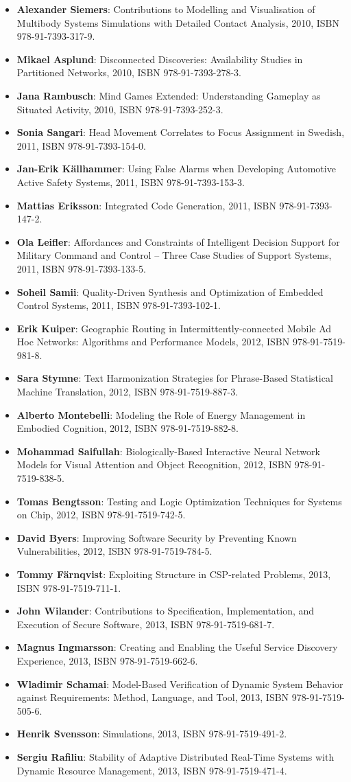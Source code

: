 \documentclass[a4paper,showtrims,twocolumn]{memoir}
\newenvironment{theses}
  {
    \begin{itemize}
      \setlength{\itemsep}{0.2em}
      \setlength{\parskip}{0em}
      \setlength{\parsep}{0em}
  }
  {
    \end{itemize}
  }
\newcommand{\thesis}[5]{\item[No. #1] \textbf{#2}: #3, #4, ISBN #5.}
\begin{document}
\begin{theses}
    \thesis{1337}{Alexander Siemers}{Contributions to Modelling and Visualisation of Multibody Systems Simulations with Detailed Contact Analysis}{2010}{978-91-7393-317-9}
    \thesis{1354}{Mikael Asplund}{Disconnected Discoveries: Availability Studies in Partitioned Networks}{2010}{978-91-7393-278-3}
    \thesis{1359}{Jana Rambusch}{Mind Games Extended: Understanding Gameplay as Situated Activity}{2010}{978-91-7393-252-3}
    \thesis{1373}{Sonia Sangari}{Head Movement Correlates to Focus Assignment in Swedish}{2011}{978-91-7393-154-0}
    \thesis{1374}{Jan-Erik Källhammer}{Using False Alarms when Developing Automotive Active Safety Systems}{2011}{978-91-7393-153-3}
    \thesis{1375}{Mattias Eriksson}{Integrated Code Generation}{2011}{978-91-7393-147-2}
    \thesis{1381}{Ola Leifler}{Affordances and Constraints of Intelligent Decision Support for Military Command and Control – Three Case Studies of Support Systems}{2011}{978-91-7393-133-5}
    \thesis{1386}{Soheil Samii}{Quality-Driven Synthesis and Optimization of Embedded Control Systems}{2011}{978-91-7393-102-1}
    \thesis{1419}{Erik Kuiper}{Geographic Routing in Intermittently-connected Mobile Ad Hoc Networks: Algorithms and Performance Models}{2012}{978-91-7519-981-8}
    \thesis{1451}{Sara Stymne}{Text Harmonization Strategies for Phrase-Based Statistical Machine Translation}{2012}{978-91-7519-887-3}
    \thesis{1455}{Alberto Montebelli}{Modeling the Role of Energy Management in Embodied Cognition}{2012}{978-91-7519-882-8}
    \thesis{1465}{Mohammad Saifullah}{Biologically-Based Interactive  Neural Network Models for Visual Attention and Object Recognition}{2012}{978-91-7519-838-5}
    \thesis{1490}{Tomas Bengtsson}{Testing and Logic Optimization Techniques for Systems on Chip}{2012}{978-91-7519-742-5}
    \thesis{1481}{David Byers}{Improving Software Security by Preventing Known Vulnerabilities}{2012}{978-91-7519-784-5}
    \thesis{1496}{Tommy Färnqvist}{Exploiting Structure in CSP-related Problems}{2013}{978-91-7519-711-1}
    \thesis{1503}{John Wilander}{Contributions to Specification, Implementation, and Execution of Secure Software}{2013}{978-91-7519-681-7}
    \thesis{1506}{Magnus Ingmarsson}{Creating and Enabling the Useful Service Discovery Experience}{2013}{978-91-7519-662-6}
    \thesis{1547}{Wladimir Schamai}{Model-Based Verification of Dynamic System Behavior against Requirements: Method, Language, and Tool}{2013}{978-91-7519-505-6}
    \thesis{1551}{Henrik Svensson}{Simulations}{2013}{978-91-7519-491-2}
    \thesis{1559}{Sergiu Rafiliu}{Stability of Adaptive Distributed Real-Time Systems with Dynamic Resource Management}{2013}{978-91-7519-471-4}

\end{theses}
\end{document}
